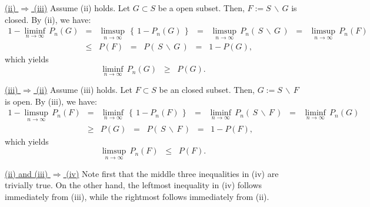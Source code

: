 \vskip 0.3cm
\noindent
\underline{(ii) $\Longrightarrow$ (iii)}
\vskip 0.2cm
\noindent
Assume (ii) holds. Let $G \subset S$ be a open subset.
Then, $F := S\,\backslash\,G$ is closed. By (ii), we have:
\begin{eqnarray*}
1 - \liminf_{n\rightarrow\infty}\,P_{n}\!\left(G\right)
&=& \limsup_{n\rightarrow\infty}\,\left\{\,1 - P_{n}\!\left(G\right)\,\right\}
\;\;=\;\;\limsup_{n\rightarrow\infty}\,P_{n}\!\left(\,S\,\backslash\,G\,\right)
\;\;=\;\;\limsup_{n\rightarrow\infty}\,P_{n}(F)
\\
&\leq& P\!\left(F\right)
\;\;=\;\; P\!\left(\,S\,\backslash\,G\,\right)
\;\;=\;\; 1 - P\!\left(G\right),
\end{eqnarray*}
which yields
\begin{equation}
\liminf_{n\rightarrow\infty}\,P_{n}\!\left(G\right)
\;\;\geq\;\; P\!\left(G\right).
\end{equation}

\vskip 0.3cm
\noindent
\underline{(iii) $\Longrightarrow$ (ii)}
\vskip 0.2cm
\noindent
Assume (iii) holds. Let $F \subset S$ be an closed subset.
Then, $G := S\,\backslash\,F$ is open. By (iii), we have:
\begin{eqnarray*}
1 - \limsup_{n\rightarrow\infty}\,P_{n}\!\left(F\right)
&=& \liminf_{n\rightarrow\infty}\,\left\{\,1 - P_{n}\!\left(F\right)\,\right\}
\;\;=\;\;\liminf_{n\rightarrow\infty}\,P_{n}\!\left(\,S\,\backslash\,F\,\right)
\;\;=\;\;\liminf_{n\rightarrow\infty}\,P_{n}(G)
\\
&\geq& P\!\left(G\right)
\;\;=\;\; P\!\left(\,S\,\backslash\,F\,\right)
\;\;=\;\; 1 - P\!\left(F\right),
\end{eqnarray*}
which yields
\begin{equation}
\limsup_{n\rightarrow\infty}\,P_{n}\!\left(F\right)
\;\;\leq\;\; P\!\left(F\right).
\end{equation}

\vskip 0.3cm
\noindent
\underline{(ii) and (iii) $\Longrightarrow$ (iv)}
\vskip 0.2cm
\noindent
Note first that the middle three inequalities in (iv) are trivially true.
On the other hand, the leftmost inequality in (iv) follows immediately from (iii),
while the rightmost follows immediately from (ii).

